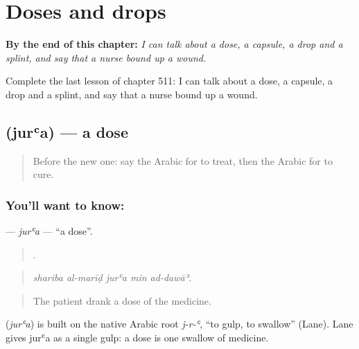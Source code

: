 
\chapter{Doses and drops}
\label{ch:ar-doses-and-drops}

\begin{chapteropening}
\textbf{By the end of this chapter:} \emph{I can talk about a dose, a capsule, a drop and a splint, and say that a nurse bound up a wound.}

Complete the last lesson of chapter 511: I can talk about a dose, a capsule, a drop and a splint, and say that a nurse bound up a wound.
\end{chapteropening}

\section[\texorpdfstring{\ar{جرعة} (jurʿa)}{جرعة (jurʿa)}]{ (jurʿa) — a dose}

\label{lesson:AR-C511-jura}



\begin{quote}
Before the new one: say the Arabic for to treat, then the Arabic for to cure.
\end{quote}

\subsection*{You'll want to know: }
\textbf{} — \emph{jurʿa} — \textquotedblleft{}a dose\textquotedblright{}.

\begin{quote}
    .
\end{quote}

\begin{quote}
\emph{shariba al-marīḍ jurʿa min ad-dawāʾ.}
\end{quote}

\begin{quote}
The patient drank a dose of the medicine.
\end{quote}

\begin{cousinweb}
\textbf{} (\emph{jurʿa}) is built on the native Arabic root \emph{j-r-ʿ}, \textquotedblleft{}to gulp, to swallow\textquotedblright{} (Lane). Lane gives jurʿa as a single gulp: a dose is one swallow of medicine.
\end{cousinweb}

